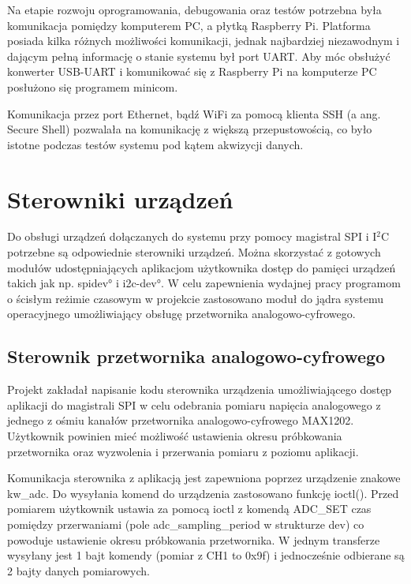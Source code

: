 Na etapie rozwoju oprogramowania, debugowania oraz testów potrzebna była komunikacja pomiędzy komputerem PC, a płytką Raspberry Pi. Platforma posiada kilka różnych możliwości komunikacji, jednak najbardziej niezawodnym i dającym pełną informację o stanie systemu był port UART. Aby móc obsłużyć konwerter USB-UART i komunikować się z Raspberry Pi na komputerze PC posłużono się programem minicom.

Komunikacja przez port Ethernet, bądź WiFi za pomocą klienta SSH (a ang. Secure Shell) pozwalała na komunikację z większą przepustowością, co było istotne podczas testów systemu pod kątem akwizycji danych. 

\section{Sterowniki urządzeń}
Do obsługi urządzeń dołączanych do systemu przy pomocy magistral SPI i 
I$^2$C potrzebne są odpowiednie sterowniki urządzeń. Można skorzystać z gotowych modułów udostępniających aplikacjom użytkownika dostęp do pamięci urządzeń takich jak np. \ang{spidev}\cite{spidev} i \ang{i2c-dev}\cite{i2cdev}. W celu zapewnienia wydajnej pracy programom o ścisłym reżimie czasowym w projekcie zastosowano moduł do jądra systemu operacyjnego umożliwiający obsługę przetwornika analogowo-cyfrowego.

\subsection{Sterownik przetwornika analogowo-cyfrowego}

Projekt zakładał napisanie kodu sterownika urządzenia umożliwiającego dostęp aplikacji do magistrali SPI w celu odebrania pomiaru napięcia analogowego z jednego z ośmiu kanałów przetwornika analogowo-cyfrowego MAX1202. Użytkownik powinien mieć możliwość ustawienia okresu próbkowania przetwornika
oraz wyzwolenia i przerwania pomiaru z poziomu aplikacji. 

Komunikacja sterownika z aplikacją jest zapewniona poprzez urządzenie znakowe kw\_adc.
Do wysyłania komend do urządzenia zastosowano funkcję ioctl(). Przed pomiarem użytkownik ustawia za pomocą ioctl z komendą ADC\_SET czas pomiędzy przerwaniami (pole adc\_sampling\_period w strukturze dev) co powoduje ustawienie okresu próbkowania przetwornika. 
W jednym transferze wysyłany jest 1 bajt komendy (pomiar z CH1 to 0x9f) i jednocześnie odbierane są 2 bajty danych pomiarowych. 

